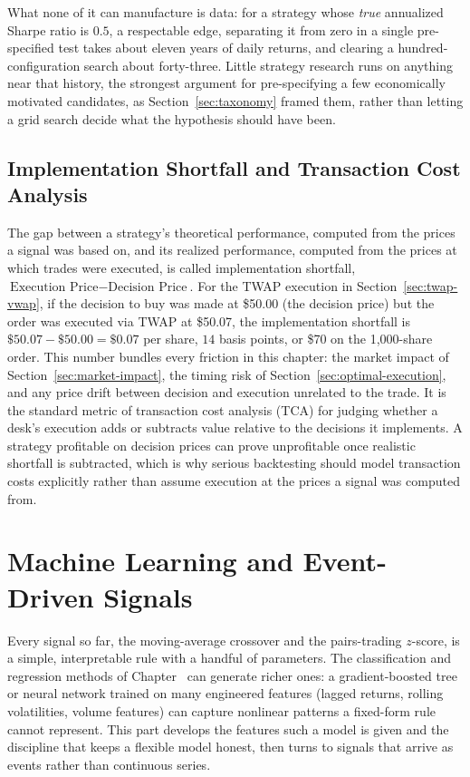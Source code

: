 \documentclass[../ai_in_finance]{subfiles}
\begin{document}
What none of it can manufacture is data: for a strategy whose \emph{true} annualized Sharpe ratio is $0.5$, a respectable edge, separating it from zero in a single pre-specified test takes about eleven years of daily returns, and clearing a hundred-configuration search about forty-three. Little strategy research runs on anything near that history, the strongest argument for pre-specifying a few economically motivated candidates, as Section~\ref{sec:taxonomy} framed them, rather than letting a grid search decide what the hypothesis should have been.

\subsection{Implementation Shortfall and Transaction Cost Analysis}

The gap between a strategy's theoretical performance, computed from the prices a signal was based on, and its realized performance, computed from the prices at which trades were executed, is called implementation shortfall, $\text{Execution Price} - \text{Decision Price}$. For the TWAP execution in Section~\ref{sec:twap-vwap}, if the decision to buy was made at \$50.00 (the decision price) but the order was executed via TWAP at \$50.07, the implementation shortfall is $\$50.07 - \$50.00 = \$0.07$ per share, $14$ basis points, or \$70 on the 1,000-share order. This number bundles every friction in this chapter: the market impact of Section~\ref{sec:market-impact}, the timing risk of Section~\ref{sec:optimal-execution}, and any price drift between decision and execution unrelated to the trade. It is the standard metric of transaction cost analysis (TCA) for judging whether a desk's execution adds or subtracts value relative to the decisions it implements. A strategy profitable on decision prices can prove unprofitable once realistic shortfall is subtracted, which is why serious backtesting should model transaction costs explicitly rather than assume execution at the prices a signal was computed from.

\section{Machine Learning and Event-Driven Signals}

Every signal so far, the moving-average crossover and the pairs-trading $z$-score, is a simple, interpretable rule with a handful of parameters. The classification and regression methods of Chapter~ can generate richer ones: a gradient-boosted tree or neural network trained on many engineered features (lagged returns, rolling volatilities, volume features) can capture nonlinear patterns a fixed-form rule cannot represent. This part develops the features such a model is given and the discipline that keeps a flexible model honest, then turns to signals that arrive as events rather than continuous series.
\end{document}
